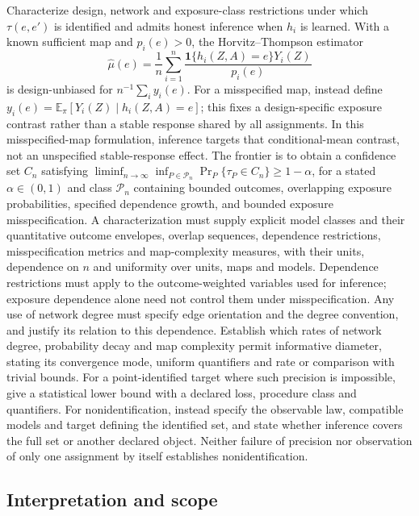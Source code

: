 \documentclass[11pt,a4paper]{article}
\begin{document}
Characterize design, network and exposure-class restrictions under which $\tau(e,e')$ is identified and admits honest inference when $h_i$ is learned. With a known sufficient map and $p_i(e)>0$, the Horvitz--Thompson estimator
\[
\widehat\mu(e)=\frac1n\sum_{i=1}^n
\frac{\mathbf1\{h_i(Z,A)=e\}Y_i(Z)}{p_i(e)}
\]
is design-unbiased for $n^{-1}\sum_i y_i(e)$. For a misspecified map, instead define $y_i(e)=\mathbb E_\pi[Y_i(Z)\mid h_i(Z,A)=e]$; this fixes a design-specific exposure contrast rather than a stable response shared by all assignments. In this misspecified-map formulation, inference targets that conditional-mean contrast, not an unspecified stable-response effect. The frontier is to obtain a confidence set $C_n$ satisfying $\liminf_{n\to\infty}\inf_{P\in\mathcal P_n}\Pr_P\{\tau_P\in C_n\}\ge1-\alpha$, for a stated $\alpha\in(0,1)$ and class $\mathcal P_n$ containing bounded outcomes, overlapping exposure probabilities, specified dependence growth, and bounded exposure misspecification. A characterization must supply explicit model classes and their quantitative outcome envelopes, overlap sequences, dependence restrictions, misspecification metrics and map-complexity measures, with their units, dependence on $n$ and uniformity over units, maps and models. Dependence restrictions must apply to the outcome-weighted variables used for inference; exposure dependence alone need not control them under misspecification. Any use of network degree must specify edge orientation and the degree convention, and justify its relation to this dependence. Establish which rates of network degree, probability decay and map complexity permit informative diameter, stating its convergence mode, uniform quantifiers and rate or comparison with trivial bounds. For a point-identified target where such precision is impossible, give a statistical lower bound with a declared loss, procedure class and quantifiers. For nonidentification, instead specify the observable law, compatible models and target defining the identified set, and state whether inference covers the full set or another declared object. Neither failure of precision nor observation of only one assignment by itself establishes nonidentification.

\subsection*{Interpretation and scope}
\end{document}
